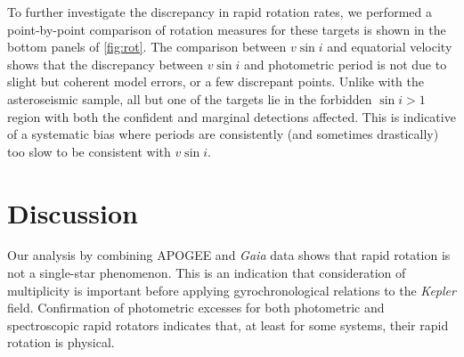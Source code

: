 \documentclass[manuscript]{aastex6}
\newcommand{\vsini}{\ensuremath{v \sin i}}
\newcommand{\Kepler}{\mbox{\textit{Kepler}}}
\newcommand{\Gaia}{\mbox{\textit{Gaia}}}
\newcommand{\gvs}{\authorcomment1}
\begin{document}
\begin{figure*}
  \caption{\emph{Left:} APOGEE \vsini{} plotted against equatorial
  velocity computed from the rotation period and radius for targets with
  detected rapid rotation. Targets which are photometric binaries are plotted
  as large circles while targets which are on the single photometric sequence
  are plotted as small stars. The confirmed \vsini{} detections are shown
  in dark blue while the marginal \vsini{} detections are shown in light
  blue. The solid and dashed lines correspond to values where \(\sin i =
  1, 0.5\), respectively. The hatched area represents the forbidden
  region where \(\sin i > 1\). \emph{Middle:} Symbols are similar to left
  side, except points are projected such that the DSEP-derived radius is
  plotted against the radius inferred from \vsini{} and rotation
  period. \emph{Right:} Symbols are similar to left side, except points are
  projected such that the \citet{McQuillan14} period is plotted against the
  period inferred from the \vsini{} and radius.\label{fig:rot}}
\end{figure*}

To further investigate the discrepancy in rapid rotation rates, we
performed a point-by-point comparison of rotation measures for these 
targets is shown in the bottom panels of
\cref{fig:rot}. The comparison between \vsini{} and equatorial velocity shows
that the discrepancy between \vsini{} and photometric period is not due to slight
but coherent model errors, or a few discrepant points. Unlike with the
asteroseismic sample, all but one of the targets
lie in the forbidden \(\sin i > 1\) region with both the confident and
marginal detections affected. This is indicative of a systematic
bias where periods are consistently (and sometimes drastically) too slow to be
consistent with \vsini{}.

\section{Discussion}
\label{sec:discussion}

\gvs{Under Construction}

Our analysis by combining APOGEE and \Gaia{} data shows that rapid
rotation is not a single-star phenomenon. This is an indication that
consideration of multiplicity is important before applying gyrochronological
relations to the \Kepler{} field. Confirmation of photometric excesses for 
both photometric and spectroscopic rapid rotators indicates that, at least
for some systems, their rapid rotation is physical.
\end{document}
